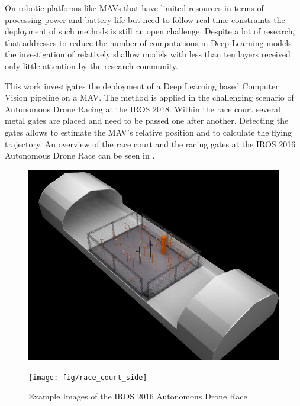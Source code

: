 On robotic platforms like \acp{MAV} that have limited resources in terms of processing power and battery life but need to follow real-time constraints the deployment of such methods is still an open challenge. Despite a lot of research, that addresses to reduce the number of computations in Deep Learning models \cite{YoungwanLee, Zagoruyko2016, Howard2017, Ghosh2017, Sandler2018, Zhang2017a} the investigation of relatively shallow models with less than ten layers received only little attention by the research community.

This work investigates the deployment of a Deep Learning based Computer Vision pipeline on a \ac{MAV}. The method is applied in the challenging scenario of Autonomous Drone Racing at the \ac{IROS} 2018. Within the race court several metal gates are placed and need to be passed one after another. Detecting the gates allows to estimate the \ac{MAV}'s relative position and to calculate the flying trajectory. An overview of the race court and the racing gates at the \ac{IROS} 2016 Autonomous Drone Race can be seen in .

\begin{figure}[bhtp]
	\centering
	\begin{minipage}{0.45\linewidth}
	\includegraphics[width=\textwidth]{fig/race_court}
	\end{minipage}\hfill
\begin{minipage}{0.45\linewidth}
	\texttt{[image: fig/race\_court\_side]}
\end{minipage}
\caption{Example Images of the \ac{IROS} 2016 Autonomous Drone Race}
\label{fig:race_court}
\end{figure}

